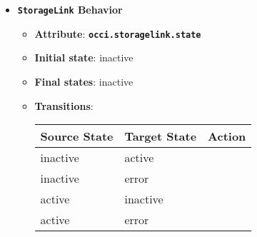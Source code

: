 \begin{itemize}
\item \textbf{\texttt{StorageLink} Behavior}
\begin{itemize}
\item \textbf{Attribute}: \textbf{\texttt{occi.storagelink.state}}
\item \textbf{Initial state}: inactive
\item \textbf{Final states}:  	inactive
\item \textbf{Transitions}:

\begin{center}
\begin{tabular}{|l|l|l|}
  \hline
  \textbf{Source State} & \textbf{Target State} & \textbf{Action} \\
  \hline  
  inactive & active &   \\
  \hline
  inactive & error &   \\
  \hline
  active & inactive &   \\
  \hline
  active & error &   \\
  \hline
\end{tabular}
\end{center}
\end{itemize}
\end{itemize}

